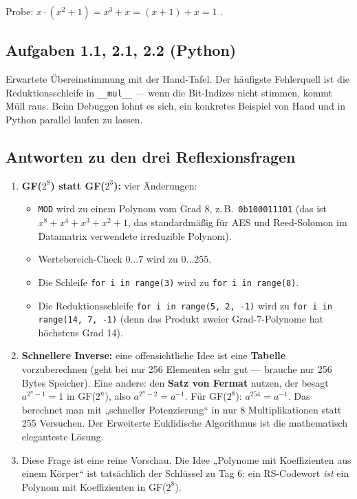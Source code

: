 Probe: $x \cdot (x^2+1) = x^3 + x = (x+1) + x = 1$ \checkmark.

\subsection*{Aufgaben 1.1, 2.1, 2.2 (Python)}

Erwartete Übereinstimmung mit der Hand-Tafel. Der häufigste
Fehlerquell ist die Reduktionsschleife in \texttt{\_\_mul\_\_} —
wenn die Bit-Indizes nicht stimmen, kommt Müll raus. Beim Debuggen
lohnt es sich, ein konkretes Beispiel von Hand und in Python parallel
laufen zu lassen.

\subsection*{Antworten zu den drei Reflexionsfragen}

\begin{enumerate}
\item \textbf{GF($2^8$) statt GF($2^3$):} vier Änderungen:
  \begin{itemize}
  \item \texttt{MOD} wird zu einem Polynom vom Grad 8, z.\,B.\
    \texttt{0b100011101} (das ist $x^8+x^4+x^3+x^2+1$, das
    standardmäßig für AES und Reed-Solomon im Datamatrix verwendete
    irreduzible Polynom).
  \item Wertebereich-Check $0 \dots 7$ wird zu $0 \dots 255$.
  \item Die Schleife \texttt{for i in range(3)} wird zu \texttt{for
    i in range(8)}.
  \item Die Reduktionsschleife \texttt{for i in range(5, 2, -1)}
    wird zu \texttt{for i in range(14, 7, -1)} (denn das Produkt
    zweier Grad-7-Polynome hat höchstens Grad 14).
  \end{itemize}

\item \textbf{Schnellere Inverse:} eine offensichtliche Idee ist eine
  \textbf{Tabelle} vorzuberechnen (geht bei nur 256 Elementen sehr
  gut — brauche nur 256 Bytes Speicher). Eine andere: den
  \textbf{Satz von Fermat} nutzen, der besagt $a^{2^n - 1} = 1$ in
  GF($2^n$), also $a^{2^n - 2} = a^{-1}$. Für GF($2^8$): $a^{254} =
  a^{-1}$. Das berechnet man mit „schneller Potenzierung“ in nur 8
  Multiplikationen statt 255 Versuchen. Der Erweiterte Euklidische
  Algorithmus ist die mathematisch eleganteste Lösung.

\item Diese Frage ist eine reine Vorschau. Die Idee „Polynome mit
  Koeffizienten aus einem Körper“ ist tatsächlich der Schlüssel zu
  Tag 6: ein RS-Codewort \emph{ist} ein Polynom mit Koeffizienten
  in GF($2^8$).
\end{enumerate}
